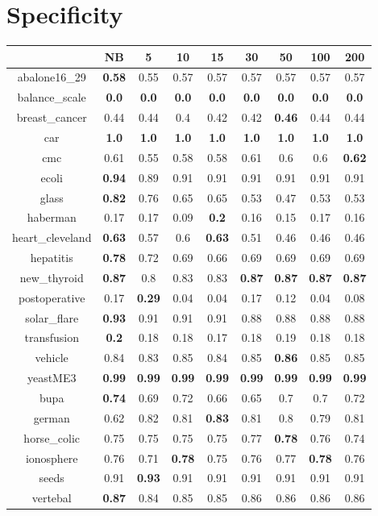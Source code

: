 \documentclass{article}%
\begin{document}
%
\section*{Specificity}%
\begin{tabular}{c|cccccccc}%
\hline%
&NB&5&10&15&30&50&100&200\\%
\hline%
abalone16\_29&\textbf{0.58}&0.55&0.57&0.57&0.57&0.57&0.57&0.57\\%
\hline%
balance\_scale&\textbf{0.0}&\textbf{0.0}&\textbf{0.0}&\textbf{0.0}&\textbf{0.0}&\textbf{0.0}&\textbf{0.0}&\textbf{0.0}\\%
\hline%
breast\_cancer&0.44&0.44&0.4&0.42&0.42&\textbf{0.46}&0.44&0.44\\%
\hline%
car&\textbf{1.0}&\textbf{1.0}&\textbf{1.0}&\textbf{1.0}&\textbf{1.0}&\textbf{1.0}&\textbf{1.0}&\textbf{1.0}\\%
\hline%
cmc&0.61&0.55&0.58&0.58&0.61&0.6&0.6&\textbf{0.62}\\%
\hline%
ecoli&\textbf{0.94}&0.89&0.91&0.91&0.91&0.91&0.91&0.91\\%
\hline%
glass&\textbf{0.82}&0.76&0.65&0.65&0.53&0.47&0.53&0.53\\%
\hline%
haberman&0.17&0.17&0.09&\textbf{0.2}&0.16&0.15&0.17&0.16\\%
\hline%
heart\_cleveland&\textbf{0.63}&0.57&0.6&\textbf{0.63}&0.51&0.46&0.46&0.46\\%
\hline%
hepatitis&\textbf{0.78}&0.72&0.69&0.66&0.69&0.69&0.69&0.69\\%
\hline%
new\_thyroid&\textbf{0.87}&0.8&0.83&0.83&\textbf{0.87}&\textbf{0.87}&\textbf{0.87}&\textbf{0.87}\\%
\hline%
postoperative&0.17&\textbf{0.29}&0.04&0.04&0.17&0.12&0.04&0.08\\%
\hline%
solar\_flare&\textbf{0.93}&0.91&0.91&0.91&0.88&0.88&0.88&0.88\\%
\hline%
transfusion&\textbf{0.2}&0.18&0.18&0.17&0.18&0.19&0.18&0.18\\%
\hline%
vehicle&0.84&0.83&0.85&0.84&0.85&\textbf{0.86}&0.85&0.85\\%
\hline%
yeastME3&\textbf{0.99}&\textbf{0.99}&\textbf{0.99}&\textbf{0.99}&\textbf{0.99}&\textbf{0.99}&\textbf{0.99}&\textbf{0.99}\\%
\hline%
bupa&\textbf{0.74}&0.69&0.72&0.66&0.65&0.7&0.7&0.72\\%
\hline%
german&0.62&0.82&0.81&\textbf{0.83}&0.81&0.8&0.79&0.81\\%
\hline%
horse\_colic&0.75&0.75&0.75&0.75&0.77&\textbf{0.78}&0.76&0.74\\%
\hline%
ionosphere&0.76&0.71&\textbf{0.78}&0.75&0.76&0.77&\textbf{0.78}&0.76\\%
\hline%
seeds&0.91&\textbf{0.93}&0.91&0.91&0.91&0.91&0.91&0.91\\%
\hline%
vertebal&\textbf{0.87}&0.84&0.85&0.85&0.86&0.86&0.86&0.86\\%
\hline%
\end{tabular}
\end{document}

